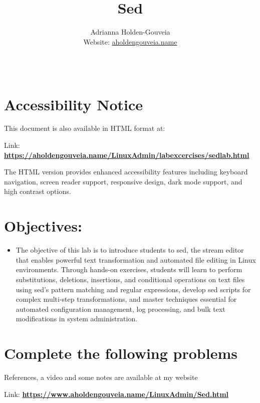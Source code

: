 \documentclass[12pt]{article}
\title{Sed}
\author{
        Adrianna Holden-Gouveia \\
        Website: \href{https://aholdengouveia.name}{aholdengouveia.name}\\ 
        \date{\vspace{-5ex}}
        \faGithub {: aholdengouveia} \\
        }
\begin{document}
    

\maketitle



\section*{Accessibility Notice}
This document is also available in HTML format at:

Link: \href{https://aholdengouveia.name/LinuxAdmin/labexcercises/sedlab.html}{\textbf{https://aholdengouveia.name/LinuxAdmin/labexcercises/sedlab.html}}

The HTML version provides enhanced accessibility features including keyboard navigation, screen reader support, responsive design, dark mode support, and high contrast options.

\section*{Objectives:}
\begin{itemize}
    \item The objective of this lab is to introduce students to sed, the stream editor that enables powerful text transformation and automated file editing in Linux environments. Through hands-on exercises, students will learn to perform substitutions, deletions, insertions, and conditional operations on text files using sed's pattern matching and regular expressions, develop sed scripts for complex multi-step transformations, and master techniques essential for automated configuration management, log processing, and bulk text modifications in system administration.
\end{itemize}
\section*{Complete the following problems}

References, a video and some notes are available at my website

Link: \href{https://www.aholdengouveia.name/LinuxAdmin/Sed.html}{\textbf{https://www.aholdengouveia.name/LinuxAdmin/Sed.html}}
\end{document}
